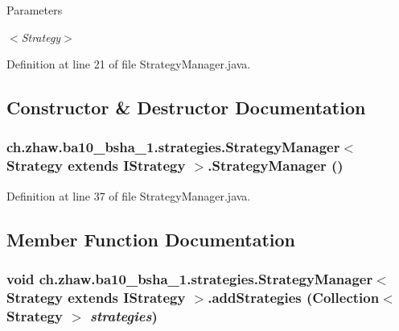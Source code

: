 \begin{DoxyParams}{Parameters}
\item[{\em $<$Strategy$>$}]\end{DoxyParams}


Definition at line 21 of file StrategyManager.java.

\subsection{Constructor \& Destructor Documentation}
\hypertarget{classch_1_1zhaw_1_1ba10__bsha__1_1_1strategies_1_1StrategyManager_3_01Strategy_01extends_01IStrategy_01_4_a6f169a8c68fda7de5893dd3ab27ba0d8}{
\subsubsection[{StrategyManager}]{\setlength{\rightskip}{0pt plus 5cm}ch.zhaw.ba10\_\-bsha\_\-1.strategies.StrategyManager$<$ Strategy extends {\bf IStrategy} $>$.StrategyManager ()}}
\label{classch_1_1zhaw_1_1ba10__bsha__1_1_1strategies_1_1StrategyManager_3_01Strategy_01extends_01IStrategy_01_4_a6f169a8c68fda7de5893dd3ab27ba0d8}


Definition at line 37 of file StrategyManager.java.

\subsection{Member Function Documentation}
\hypertarget{classch_1_1zhaw_1_1ba10__bsha__1_1_1strategies_1_1StrategyManager_3_01Strategy_01extends_01IStrategy_01_4_a1acc734943ac906a5d8b9df261f30b58}{
\subsubsection[{addStrategies}]{\setlength{\rightskip}{0pt plus 5cm}void ch.zhaw.ba10\_\-bsha\_\-1.strategies.StrategyManager$<$ Strategy extends {\bf IStrategy} $>$.addStrategies (Collection$<$ Strategy $>$ {\em strategies})}}
\label{classch_1_1zhaw_1_1ba10__bsha__1_1_1strategies_1_1StrategyManager_3_01Strategy_01extends_01IStrategy_01_4_a1acc734943ac906a5d8b9df261f30b58}


